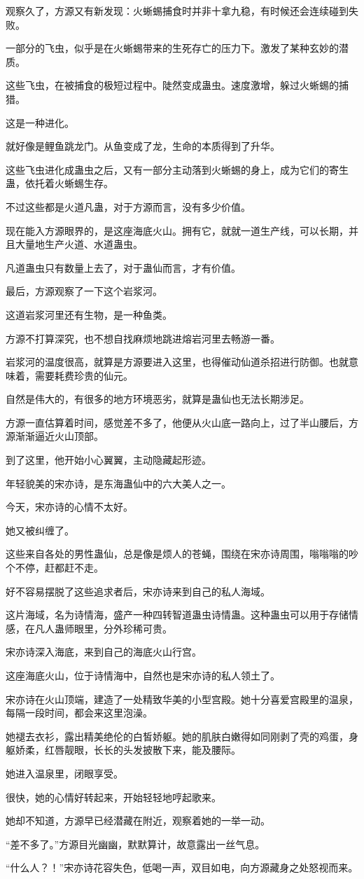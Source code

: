 \begin{this_body}
观察久了，方源又有新发现：火蜥蜴捕食时并非十拿九稳，有时候还会连续碰到失败。

一部分的飞虫，似乎是在火蜥蜴带来的生死存亡的压力下。激发了某种玄妙的潜质。

这些飞虫，在被捕食的极短过程中。陡然变成蛊虫。速度激增，躲过火蜥蜴的捕猎。

这是一种进化。

就好像是鲤鱼跳龙门。从鱼变成了龙，生命的本质得到了升华。

这些飞虫进化成蛊虫之后，又有一部分主动落到火蜥蜴的身上，成为它们的寄生蛊，依托着火蜥蜴生存。

不过这些都是火道凡蛊，对于方源而言，没有多少价值。

现在能入方源眼界的，是这座海底火山。拥有它，就就一道生产线，可以长期，并且大量地生产火道、水道蛊虫。

凡道蛊虫只有数量上去了，对于蛊仙而言，才有价值。

最后，方源观察了一下这个岩浆河。

这道岩浆河里还有生物，是一种鱼类。

方源不打算深究，也不想自找麻烦地跳进熔岩河里去畅游一番。

岩浆河的温度很高，就算是方源要进入这里，也得催动仙道杀招进行防御。也就意味着，需要耗费珍贵的仙元。

自然是伟大的，有很多的地方环境恶劣，就算是蛊仙也无法长期涉足。

方源一直估算着时间，感觉差不多了，他便从火山底一路向上，过了半山腰后，方源渐渐逼近火山顶部。

到了这里，他开始小心翼翼，主动隐藏起形迹。

年轻貌美的宋亦诗，是东海蛊仙中的六大美人之一。

今天，宋亦诗的心情不太好。

她又被纠缠了。

这些来自各处的男性蛊仙，总是像是烦人的苍蝇，围绕在宋亦诗周围，嗡嗡嗡的吵个不停，赶都赶不走。

好不容易摆脱了这些追求者后，宋亦诗来到自己的私人海域。

这片海域，名为诗情海，盛产一种四转智道蛊虫诗情蛊。这种蛊虫可以用于存储情感，在凡人蛊师眼里，分外珍稀可贵。

宋亦诗深入海底，来到自己的海底火山行宫。

这座海底火山，位于诗情海中，自然也是宋亦诗的私人领土了。

宋亦诗在火山顶端，建造了一处精致华美的小型宫殿。她十分喜爱宫殿里的温泉，每隔一段时间，都会来这里泡澡。

她褪去衣衫，露出精美绝伦的白皙娇躯。她的肌肤白嫩得如同刚剥了壳的鸡蛋，身躯娇柔，红唇靓眼，长长的头发披散下来，能及腰际。

她进入温泉里，闭眼享受。

很快，她的心情好转起来，开始轻轻地哼起歌来。

她却不知道，方源早已经潜藏在附近，观察着她的一举一动。

“差不多了。”方源目光幽幽，默默算计，故意露出一丝气息。

“什么人？！”宋亦诗花容失色，低喝一声，双目如电，向方源藏身之处怒视而来。

\end{this_body}

